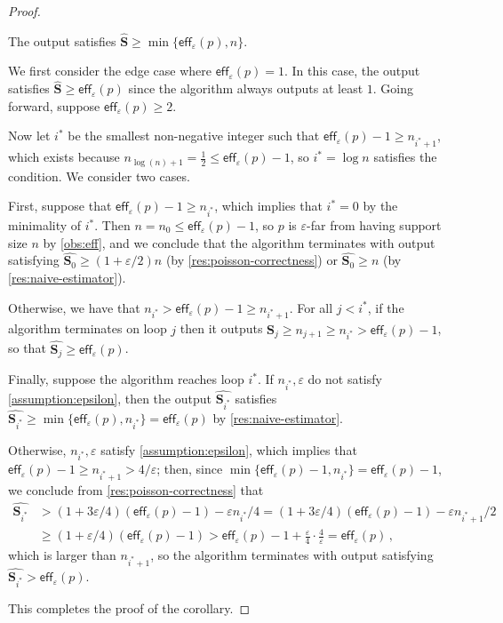 \documentclass{theoretics}
\newcommand{\eff}{\mathsf{eff}}
\renewcommand{\epsilon}{\varepsilon}
\begin{document}
\begin{proof}
\begin{claim}
    The output satisfies $\widehat{\bm{S}} \ge \min\{\eff_\epsilon(p), n\}$.
\end{claim}
\begin{subproof}
    We first consider the edge case where $\eff_\epsilon(p) = 1$. In this case, the output satisfies
    $\widehat{\bm{S}} \ge \eff_\epsilon(p)$ since the algorithm always outputs at least
    $1$. Going forward, suppose $\eff_\epsilon(p) \ge 2$.

    Now let $i^*$ be the smallest non-negative integer such that $\eff_\epsilon(p)-1 \geq
    n_{i^*+1}$, which exists because $n_{\log(n)+1} = \frac{1}{2} \le \eff_\epsilon(p)-1$, so $i^* =
    \log n$ satisfies the condition. We consider two cases.

    First, suppose that $\eff_\epsilon(p)-1 \ge n_{i^*}$, which implies that $i^* = 0$ by the
    minimality of $i^*$. Then $n = n_0 \le \eff_\epsilon(p)-1$, so $p$ is $\epsilon$-far from having
    support size $n$ by \cref{obs:eff}, and we conclude that the algorithm terminates with output
    satisfying $\widehat{\bm{S}_0} \ge (1+\epsilon/2) n$ (by \cref{res:poisson-correctness}) or
    $\widehat{\bm{S}_0} \ge n$ (by \cref{res:naive-estimator}).

    Otherwise, we have that $n_{i^*} > \eff_\epsilon(p)-1 \geq n_{i^*+1}$. For all $j < i^*$, if the
    algorithm terminates on loop $j$ then it outputs $\widehat{\bm{S}_j} \geq n_{j+1} \geq n_{i^*} >
    \eff_\epsilon(p)-1$, so that $\widehat{\bm{S}_j} \ge \eff_\epsilon(p)$.

    Finally, suppose the algorithm reaches loop $i^*$. If $n_{i^*}, \epsilon$ do not satisfy
    \cref{assumption:epsilon}, then the output $\widehat{\bm{S}_{i^*}}$ satisfies
    $\widehat{\bm{S}_{i^*}} \ge \min\{\eff_\epsilon(p), n_{i^*}\} = \eff_\epsilon(p)$ by
    \cref{res:naive-estimator}.

    Otherwise, $n_{i^*}, \epsilon$ satisfy \cref{assumption:epsilon}, which implies that
    $\eff_\epsilon(p)-1 \ge n_{i^*+1} > 4/\epsilon$; then, since $\min\{\eff_\epsilon(p)-1,
    n_{i^*}\} = \eff_\epsilon(p)-1$, we conclude from \cref{res:poisson-correctness} that
    \begin{align*}
      \widehat{\bm{S}_{i^*}}
      &> (1+3\epsilon/4) (\eff_\epsilon(p)-1) - \epsilon n_{i^*}/4
      = (1+3\epsilon/4) (\eff_\epsilon(p)-1) - \epsilon n_{i^*+1} / 2 \\
      &\geq (1+\epsilon/4) (\eff_\epsilon(p)-1)
      > \eff_\epsilon(p) - 1 + \frac{\epsilon}{4} \cdot \frac{4}{\epsilon}
      = \eff_\epsilon(p) \,,
    \end{align*}
    which is larger than $n_{i^*+1}$, so the algorithm terminates with output satisfying
    $\widehat{\bm{S}_{i^*}} > \eff_\epsilon(p)$.
\end{subproof}

This completes the proof of the corollary.
\end{proof}
\end{document}

